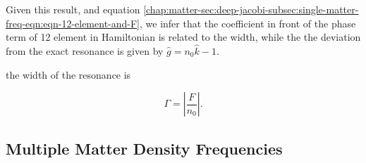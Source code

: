 Given this result, and equation \ref{chap:matter-sec:deep-jacobi-subsec:single-matter-freq-eqn:eqn-12-element-and-F}, we infer that the coefficient in front of the phase term of 12 element in Hamiltonian is related to the width, while the the deviation from the exact resonance is given by $\hat g=n_0 \hat k - 1$.




  the width of the resonance is

 \begin{equation}
 \Gamma = \left\lvert \frac{F}{n_0} \right\rvert.
 \label{chap:matter-sec:deep-jacobi-eqn:single-frequency-width-guessing}
 \end{equation}
      



















\subsection{\label{chap:matter-sec:deep-jacobi-subsec:multi-matter-freq}Multiple Matter Density Frequencies}

